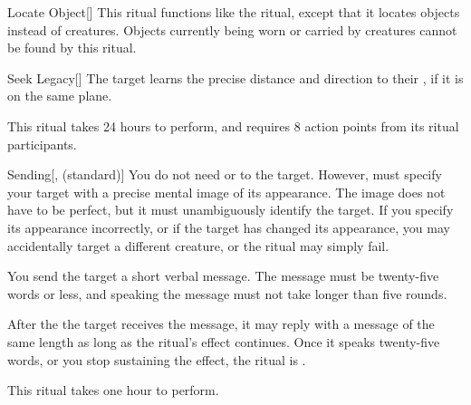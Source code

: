 \lowercase{\hypertarget{spell:Locate Object}{}}\label{spell:Locate Object}
\begin{freeability}[Rank 3]{\hypertarget{spell:Locate Object}{Locate Object}}[]
\targetrule
This ritual functions like the  ritual, except that it locates objects instead of creatures.
Objects currently being worn or carried by creatures cannot be found by this ritual.
\end{freeability}
\vspace{0.25em}



\lowercase{\hypertarget{spell:Seek Legacy}{}}\label{spell:Seek Legacy}
\begin{apability}[Rank 3]{\hypertarget{spell:Seek Legacy}{Seek Legacy}}[]
The target learns the precise distance and direction to their , if it is on the same plane.

This ritual takes 24 hours to perform, and requires 8 action points from its ritual participants.
\end{apability}
\vspace{0.25em}



\lowercase{\hypertarget{spell:Sending}{}}\label{spell:Sending}
\begin{apability}[Rank 4]{\hypertarget{spell:Sending}{Sending}}[,  (standard)]
You do not need  or  to the target.
However,  must specify your target with a precise mental image of its appearance.
The image does not have to be perfect, but it must unambiguously identify the target.
If you specify its appearance incorrectly, or if the target has changed its appearance, you may accidentally target a different creature, or the ritual may simply fail.

You send the target a short verbal message.
The message must be twenty-five words or less, and speaking the message must not take longer than five rounds.

After the the target receives the message, it may reply with a message of the same length as long as the ritual's effect continues.
Once it speaks twenty-five words, or you stop sustaining the effect, the ritual is .

This ritual takes one hour to perform.
\end{apability}
\vspace{0.25em}



